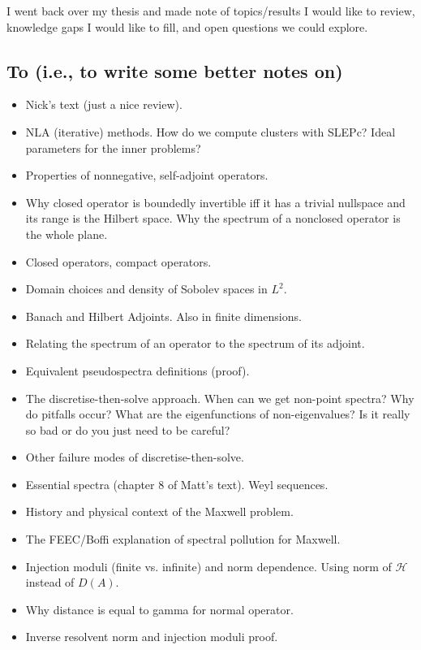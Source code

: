 \documentclass[12pt,a4paper]{article}
\begin{document}
I went back over my thesis and made note of topics/results I would like to review, knowledge gaps I would like to fill, and open questions we could explore. 

\subsection{To  (i.e., to write some better notes on)}

\begin{itemize}
    \item Nick's text (just a nice review).
    \item NLA (iterative) methods. How do we compute clusters with SLEPc? Ideal parameters for the inner problems?
    \item Properties of nonnegative, self-adjoint operators.
    \item Why closed operator is boundedly invertible iff it has a trivial nullspace and its range is the Hilbert space. Why the spectrum of a nonclosed operator is the whole plane. 
    \item Closed operators, compact operators. 
    \item Domain choices and density of Sobolev spaces in $L^2.$
    \item Banach and Hilbert Adjoints. Also in finite dimensions.
    \item Relating the spectrum of an operator to the spectrum of its adjoint. 
    \item Equivalent pseudospectra definitions (proof). 
    \item The discretise-then-solve approach. When can we get non-point spectra? Why do pitfalls occur? What are the eigenfunctions of non-eigenvalues? Is it really so bad or do you just need to be careful?
    \item Other failure modes of discretise-then-solve.
    \item Essential spectra (chapter 8 of Matt's text). Weyl sequences. 
    \item History and physical context of the Maxwell problem.
    \item The FEEC/Boffi explanation of spectral pollution for Maxwell. 
    \item Injection moduli (finite vs. infinite) and norm dependence. Using norm of $\mathcal{H}$ instead of $D(A).$
    \item Why distance is equal to gamma for normal operator. 
    \item Inverse resolvent norm and injection moduli proof. 

\end{itemize}
\end{document}
